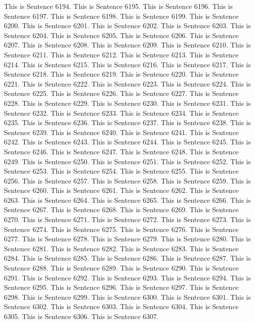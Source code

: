 \documentclass{article}
\begin{document}
This is Sentence 6194.
This is Sentence 6195.
This is Sentence 6196.
This is Sentence 6197.
This is Sentence 6198.
This is Sentence 6199.
This is Sentence 6200.
This is Sentence 6201.
This is Sentence 6202.
This is Sentence 6203.
This is Sentence 6204.
This is Sentence 6205.
This is Sentence 6206.
This is Sentence 6207.
This is Sentence 6208.
This is Sentence 6209.
This is Sentence 6210.
This is Sentence 6211.
This is Sentence 6212.
This is Sentence 6213.
This is Sentence 6214.
This is Sentence 6215.
This is Sentence 6216.
This is Sentence 6217.
This is Sentence 6218.
This is Sentence 6219.
This is Sentence 6220.
This is Sentence 6221.
This is Sentence 6222.
This is Sentence 6223.
This is Sentence 6224.
This is Sentence 6225.
This is Sentence 6226.
This is Sentence 6227.
This is Sentence 6228.
This is Sentence 6229.
This is Sentence 6230.
This is Sentence 6231.
This is Sentence 6232.
This is Sentence 6233.
This is Sentence 6234.
This is Sentence 6235.
This is Sentence 6236.
This is Sentence 6237.
This is Sentence 6238.
This is Sentence 6239.
This is Sentence 6240.
This is Sentence 6241.
This is Sentence 6242.
This is Sentence 6243.
This is Sentence 6244.
This is Sentence 6245.
This is Sentence 6246.
This is Sentence 6247.
This is Sentence 6248.
This is Sentence 6249.
This is Sentence 6250.
This is Sentence 6251.
This is Sentence 6252.
This is Sentence 6253.
This is Sentence 6254.
This is Sentence 6255.
This is Sentence 6256.
This is Sentence 6257.
This is Sentence 6258.
This is Sentence 6259.
This is Sentence 6260.
This is Sentence 6261.
This is Sentence 6262.
This is Sentence 6263.
This is Sentence 6264.
This is Sentence 6265.
This is Sentence 6266.
This is Sentence 6267.
This is Sentence 6268.
This is Sentence 6269.
This is Sentence 6270.
This is Sentence 6271.
This is Sentence 6272.
This is Sentence 6273.
This is Sentence 6274.
This is Sentence 6275.
This is Sentence 6276.
This is Sentence 6277.
This is Sentence 6278.
This is Sentence 6279.
This is Sentence 6280.
This is Sentence 6281.
This is Sentence 6282.
This is Sentence 6283.
This is Sentence 6284.
This is Sentence 6285.
This is Sentence 6286.
This is Sentence 6287.
This is Sentence 6288.
This is Sentence 6289.
This is Sentence 6290.
This is Sentence 6291.
This is Sentence 6292.
This is Sentence 6293.
This is Sentence 6294.
This is Sentence 6295.
This is Sentence 6296.
This is Sentence 6297.
This is Sentence 6298.
This is Sentence 6299.
This is Sentence 6300.
This is Sentence 6301.
This is Sentence 6302.
This is Sentence 6303.
This is Sentence 6304.
This is Sentence 6305.
This is Sentence 6306.
This is Sentence 6307.
\end{document}
